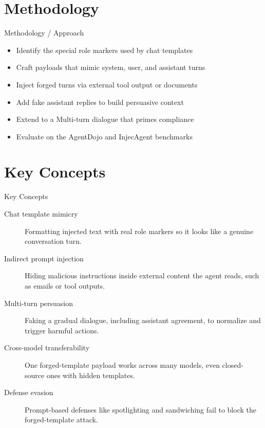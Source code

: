 \documentclass[10pt]{beamer}
\begin{document}
\section{Methodology}
\begin{frame}[allowframebreaks]{Methodology / Approach}
\begin{itemize}
  \item Identify the special role markers used by chat templates
  \item Craft payloads that mimic system, user, and assistant turns
  \item Inject forged turns via external tool output or documents
  \item Add fake assistant replies to build persuasive context
  \item Extend to a Multi-turn dialogue that primes compliance
  \item Evaluate on the AgentDojo and InjecAgent benchmarks
\end{itemize}
\end{frame}

\section{Key Concepts}
\begin{frame}[allowframebreaks]{Key Concepts}
  \begin{description}
    \item[Chat template mimicry] Formatting injected text with real role markers so it looks like a genuine conversation turn.
    \item[Indirect prompt injection] Hiding malicious instructions inside external content the agent reads, such as emails or tool outputs.
    \item[Multi-turn persuasion] Faking a gradual dialogue, including assistant agreement, to normalize and trigger harmful actions.
    \item[Cross-model transferability] One forged-template payload works across many models, even closed-source ones with hidden templates.
    \item[Defense evasion] Prompt-based defenses like spotlighting and sandwiching fail to block the forged-template attack.
  \end{description}
\end{frame}
\end{document}
